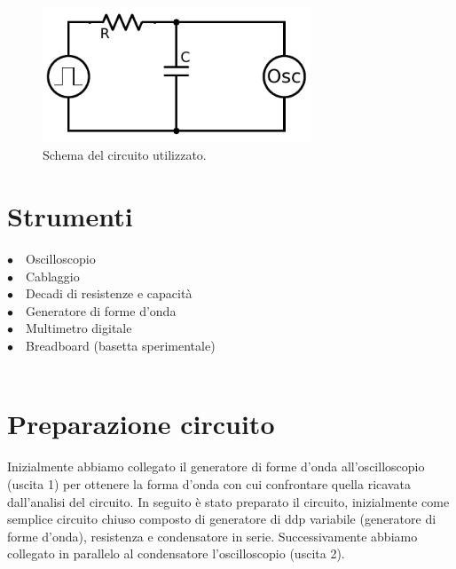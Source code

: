 \begin{figure}
	\centering
    \includegraphics[width=80mm]{schema.pdf}
    \caption{Schema del circuito utilizzato.}
    \label{fig:circuito}
\end{figure}


\section{Strumenti}

$\bullet \quad$Oscilloscopio \\
$\bullet \quad$Cablaggio\\
$\bullet \quad$Decadi di resistenze e capacità\\
$\bullet \quad$Generatore di forme d'onda\\
$\bullet \quad$Multimetro digitale\\
$\bullet \quad$Breadboard (basetta sperimentale)\\

\hspace{2pt}\\

\section{Preparazione circuito}

Inizialmente abbiamo collegato il generatore di forme d'onda all'oscilloscopio (uscita 1) per ottenere la forma d'onda con cui confrontare quella ricavata dall'analisi del circuito.
In seguito è stato preparato il circuito, inizialmente come semplice circuito chiuso composto di generatore di ddp variabile (generatore di forme d'onda), resistenza e condensatore in serie. Successivamente abbiamo collegato in parallelo al condensatore l'oscilloscopio (uscita 2).

